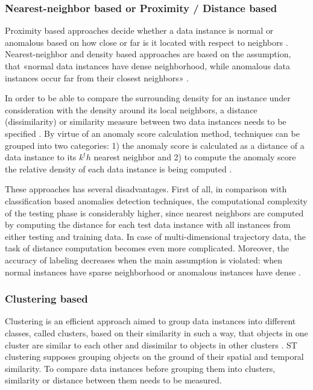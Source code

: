 \subsubsection{Nearest-neighbor based \cite{article:15_survey_ad} or Proximity / Distance based \cite{article:6_survey_anom_det_rtuvs}\cite{inproceedings:18_ardod_lstd}}
Proximity based approaches decide whether a data instance is normal or anomalous based on how close or far is it located with respect to neighbors \cite{article:6_survey_anom_det_rtuvs}. Nearest-neighbor and density based approaches are based on the assumption, that «normal data instances have dense neighborhood, while anomalous data instances occur far from their closest neighbors» \cite{article:15_survey_ad}.

In order to be able to compare the surrounding density for an instance under consideration with the density around its local neighbors, a distance (dissimilarity) or similarity measure between two data instances needs to be specified \cite{inproceedings:18_ardod_lstd}. By virtue of an anomaly score calculation method, techniques can be grouped into two categories: 1) the anomaly score is calculated as a distance of a data instance to its $k^th$ nearest neighbor and 2) to compute the anomaly score the relative density of each data instance is being computed \cite{article:15_survey_ad}.

These approaches has several disadvantages. First of all, in comparison with classification based anomalies detection techniques, the computational complexity of the testing phase is considerably higher, since nearest neighbors are computed by computing the distance for each test data instance with all instances from either testing and training data. In case of multi-dimensional trajectory data, the task of distance computation becomes even more complicated. Moreover, the accuracy of labeling decreases when the main assumption is violated: when normal instances have sparse neighborhood or anomalous instances have dense \cite{article:15_survey_ad}.

\subsubsection{Clustering based}
Clustering is an efficient approach aimed to group data instances into different classes, called clusters, based on their similarity in such a way, that objects in one cluster are similar to each other and dissimilar to objects in other clusters \cite{article:8_review_mot_cl_alg}\cite{article:22_survey_dscc}. ST clustering supposes grouping objects on the ground of their spatial and temporal similarity. To compare data instances before grouping them into clusters, similarity or distance between them needs to be measured.

